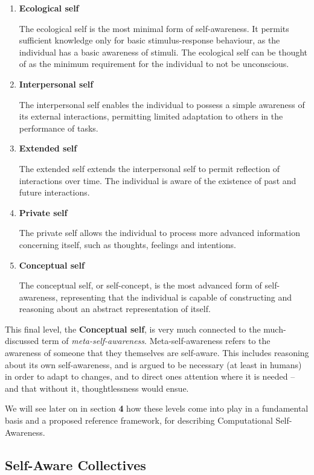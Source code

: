 \documentclass{article}
\begin{document}
\begin{enumerate}
    \item \textbf{Ecological self}
    
    The ecological self is the most minimal form of self-awareness. It permits sufficient knowledge only for basic stimulus-response behaviour, as the individual has a basic awareness of stimuli. The ecological self can be thought of as the minimum requirement for the individual to not be unconscious.
    \item \textbf{Interpersonal self}
    
    The interpersonal self enables the individual to possess a simple awareness of its external interactions, permitting limited adaptation to others in the performance of tasks.
    \item \textbf{Extended self}
    
    The extended self extends the interpersonal self to permit reflection of interactions over time. The individual is aware of the existence of past and future interactions.
    \item \textbf{Private self}
    
    The private self allows the individual to process more advanced information concerning itself, such as thoughts, feelings and intentions.
    
    \item \textbf{Conceptual self}
    
    The conceptual self, or self-concept, is the most advanced form of self-awareness, representing that the individual is capable of constructing and reasoning about an abstract representation of itself.
\end{enumerate}

This final level, the \textbf{Conceptual self}, is very much connected to the much-discussed term of \textit{meta-self-awareness}. Meta-self-awareness refers to the awareness of someone that they themselves are self-aware. This includes reasoning about its own self-awareness, and is argued to be necessary (at least in humans) in order to adapt to changes, and to direct ones attention where it is needed -- and that without it, thoughtlessness would ensue.

We will see later on in section \textbf{4} how these levels come into play in a fundamental basis and a proposed reference framework, for describing Computational Self-Awareness.


\subsection{Self-Aware Collectives}
\end{document}
